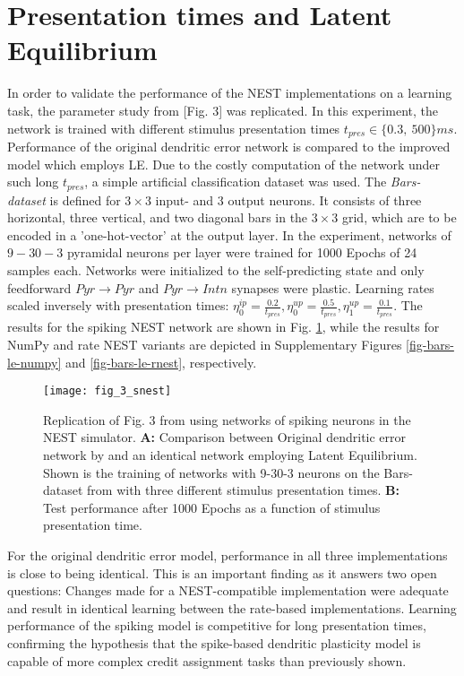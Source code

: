 \section{Presentation times and Latent Equilibrium}\label{sec-le-tpres}

In order to validate the performance of the NEST implementations on a learning task, the parameter study from
\citep{Haider2021}[Fig. 3] was replicated. In this experiment, the network is trained with different stimulus
presentation times $t_{pres} \in \{0.3,\ 500\}ms$. Performance of the original dendritic error network is compared to
the improved model which employs LE. Due to the costly computation of the network under such long $t_{pres}$, a simple
artificial classification dataset was used. The \textit{Bars-dataset} is defined for $3\times3$ input- and $3$ output
neurons. It consists of three horizontal, three vertical, and two diagonal bars in the $3\times3$ grid, which are to be
encoded in a 'one-hot-vector' at the output layer. In the experiment, networks of $9-30-3$ pyramidal neurons per layer
were trained for 1000 Epochs of 24 samples each. Networks were initialized to the self-predicting state and only
feedforward $Pyr\rightarrow Pyr$ and $Pyr \rightarrow Intn$ synapses were plastic. Learning rates scaled inversely with
presentation times: $\eta^{ip}_0 = \frac{0.2}{t_{pres}}, \eta^{up}_0 = \frac{0.5}{t_{pres}}, \eta^{up}_1 =
\frac{0.1}{t_{pres}}$. The results for the spiking NEST network are shown in Fig. \ref{fig-bars-le-snest}, while the
results for NumPy and rate NEST variants are depicted in Supplementary Figures \ref{fig-bars-le-numpy} and
\ref{fig-bars-le-rnest}, respectively.


\begin{figure}[h]
    \centering
    \texttt{[image: fig\_3\_snest]}
    \caption[Replication of Fig. 3 from \citep{Haider2021}.]{Replication of Fig. 3 from \citep{Haider2021} using
        networks of spiking neurons in the NEST simulator. \textbf{A:} Comparison between Original dendritic error
        network by and an identical network employing Latent Equilibrium. Shown is the training of networks with 9-30-3
        neurons on the Bars-dataset from with three different stimulus presentation times. \textbf{B:} Test performance
        after 1000 Epochs as a function of stimulus presentation time.}
    \label{fig-bars-le-snest}
\end{figure}

For the original dendritic error model, performance in all three implementations is close to being identical. This is an
important finding as it answers two open questions: Changes made for a NEST-compatible implementation were adequate and
result in identical learning between the rate-based implementations. Learning performance of the spiking model is
competitive for long presentation times, confirming the hypothesis that the spike-based dendritic plasticity model is
capable of more complex credit assignment tasks than previously shown.


